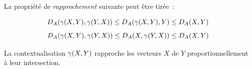 {La propriété de \emph{rapprochement} suivante peut être tirée~:

\begin{equation}
D_{A}(\gamma{(X,Y)},\gamma{(Y,X)}) \leq D_{A}(\gamma{(X,Y)},Y) \leq D_{A}(X,Y)
\end{equation}
%
\begin{equation}
D_{A}(\gamma{(X,Y)},\gamma{(Y,X)}) \leq D_{A}(X,\gamma{(Y,X)}) \leq D_{A}(X,Y)
\end{equation}

La contextualisation $\gamma{(X,Y)}$ rapproche les vecteurs $X$ de $Y$
proportionnellement à leur intersection.










}
